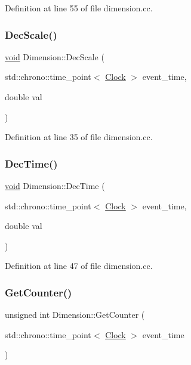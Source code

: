 Definition at line 55 of file dimension.\+cc.

\mbox{\label{class_dimension_a4bd8e584c3bb68ebd7ca0463f8905813}} 
\subsubsection{\texorpdfstring{Dec\+Scale()}{DecScale()}}
{\footnotesize\ttfamily \mbox{\hyperlink{glad_8h_a950fc91edb4504f62f1c577bf4727c29}{void}} Dimension\+::\+Dec\+Scale (\begin{DoxyParamCaption}\item[{std\+::chrono\+::time\+\_\+point$<$ \mbox{\hyperlink{universe_8h_a0ef8d951d1ca5ab3cfaf7ab4c7a6fd80}{Clock}} $>$}]{event\+\_\+time,  }\item[{double}]{val }\end{DoxyParamCaption})}



Definition at line 35 of file dimension.\+cc.

\mbox{\label{class_dimension_a25978bcb1f62aa7ed909463d08d92ca4}} 
\subsubsection{\texorpdfstring{Dec\+Time()}{DecTime()}}
{\footnotesize\ttfamily \mbox{\hyperlink{glad_8h_a950fc91edb4504f62f1c577bf4727c29}{void}} Dimension\+::\+Dec\+Time (\begin{DoxyParamCaption}\item[{std\+::chrono\+::time\+\_\+point$<$ \mbox{\hyperlink{universe_8h_a0ef8d951d1ca5ab3cfaf7ab4c7a6fd80}{Clock}} $>$}]{event\+\_\+time,  }\item[{double}]{val }\end{DoxyParamCaption})}



Definition at line 47 of file dimension.\+cc.

\mbox{\label{class_dimension_a2fbee64eeea5de3d8eab10cf0fdb6363}} 
\subsubsection{\texorpdfstring{Get\+Counter()}{GetCounter()}}
{\footnotesize\ttfamily unsigned int Dimension\+::\+Get\+Counter (\begin{DoxyParamCaption}\item[{std\+::chrono\+::time\+\_\+point$<$ \mbox{\hyperlink{universe_8h_a0ef8d951d1ca5ab3cfaf7ab4c7a6fd80}{Clock}} $>$}]{event\+\_\+time }\end{DoxyParamCaption})\hspace{0.3cm}{\ttfamily [inline]}}



